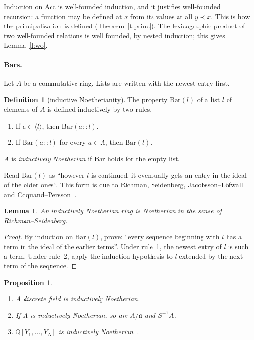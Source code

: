 \documentclass[11pt]{article}
\newcommand{\Q}{\mathbb{Q}}
\numberwithin{equation}{section}
\theoremstyle{plain}
\newtheorem{proposition}[theorem]{Proposition}
\newtheorem{lemma}[theorem]{Lemma}
\theoremstyle{definition}
\newtheorem{definition}[theorem]{Definition}
\theoremstyle{remark}
\begin{document}
Induction on $\mathrm{Acc}$ is well-founded induction, and it justifies well-founded recursion: a
function may be defined at $x$ from its values at all $y\prec x$. This is how the principalisation
is defined (Theorem~\ref{t:princ}). The lexicographic product of two well-founded relations is
well founded, by nested induction; this gives Lemma~\ref{l:wo}.

\paragraph{Bars.} Let $A$ be a commutative ring. Lists are written with the newest entry first.

\begin{definition}[inductive Noetherianity]\label{d:bar}
The property $\mathrm{Bar}(l)$ of a list $l$ of elements of $A$ is defined inductively by two rules.
\begin{enumerate}
\item If $a\in\langle l\rangle$, then $\mathrm{Bar}(a::l)$.
\item If $\mathrm{Bar}(a::l)$ for every $a\in A$, then $\mathrm{Bar}(l)$.
\end{enumerate}
$A$ is \emph{inductively Noetherian} if $\mathrm{Bar}$ holds for the empty list.
\end{definition}

Read $\mathrm{Bar}(l)$ as ``however $l$ is continued, it eventually gets an entry in the ideal of
the older ones''. This form is due to Richman, Seidenberg, Jacobsson--Löfwall and
Coquand--Persson~\cite{CP}.

\begin{lemma}\label{l:seq}
An inductively Noetherian ring is Noetherian in the sense of Richman--Seidenberg.
\end{lemma}

\begin{proof}
By induction on $\mathrm{Bar}(l)$, prove: ``every sequence beginning with $l$ has a term in the
ideal of the earlier terms''. Under rule~1, the newest entry of $l$ is such a term. Under rule~2,
apply the induction hypothesis to $l$ extended by the next term of the sequence.
\end{proof}

\begin{proposition}\label{p:barhilbert}
\begin{enumerate}
\item A discrete field is inductively Noetherian.
\item If $A$ is inductively Noetherian, so are $A/\mathfrak{a}$ and $S^{-1}A$.
\item $\Q[Y_1,\dots,Y_N]$ is inductively Noetherian~\cite{CP}.
\end{enumerate}
\end{proposition}
\end{document}

